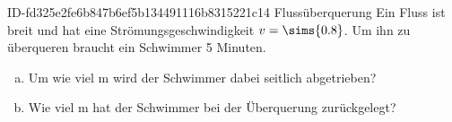 \begin{exercise}
      {ID-fd325e2fe6b847b6ef5b134491116b8315221c14}
      {Flussüberquerung}
  \ifproblem\problem
    Ein Fluss ist  breit und hat eine Strömungsgeschwindigkeit
    $v=\sims{0.8}$. Um ihn zu überqueren braucht ein Schwimmer 5 Minuten.
    \begin{enumerate}[a)]
      \item Um wie viel m wird der Schwimmer dabei seitlich abgetrieben?
      \item Wie viel m hat der Schwimmer bei der Überquerung zurückgelegt?
    \end{enumerate}
  \fi
\end{exercise}
